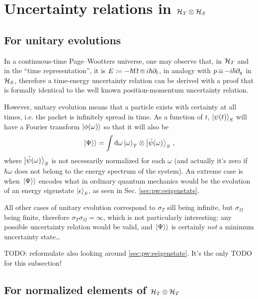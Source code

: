 \section{Uncertainty relations in $\mathcal{H}_T \otimes \mathcal{H}_S$}\label{sec:pw:uncertainty}

\subsection{For unitary evolutions}

In a continuous-time Page--Wootters universe,
one may observe that,
in $\mathcal{H}_T$ and in the ``time representation'',
it is $E \coloneqq -\hbar{\Omega} \operatorname*{\equiv} i\hbar\partial_{t}$,
in analogy with ${p} \operatorname*{\equiv} -i\hbar\partial_{q}$ in $\mathcal{H}_S$,
therefore a time-energy uncertainty relation can be derived
with a proof that is formally identical to the well known
position-momentum uncertainty relation.

However, unitary evolution means that a particle exists with
certainty at all times, i.e. the packet
is infinitely spread in time.
%
As a function of $t$, $\ket{\psi(t)}_S$ will have a Fourier transform
$\ket{\phi(\omega)}$
so that it will also be
\begin{equation}\label{eq:pwfourier}
  \left.\left| \Psi \right\rangle\right\rangle = \int \dd \omega \ket{\omega}_T \otimes \ket{\tilde{\psi}(\omega)}_S \, \text{,}
\end{equation}
where $\ket{\tilde{\psi}(\omega)}_S$ is not necessarily normalized for each $\omega$
(and actually it's zero if $\hbar\omega$ does not belong to the energy spectrum of the system).
An extreme case is when $\left.\left| \Psi \right\rangle\right\rangle$ encodes what in ordinary quantum mechanics would be the evolution
of an energy eigenstate $\ket{\epsilon}_S$, as seen in Sec. \ref{sec:pw:eeigenstate}.

All other cases of unitary evolution correspond to $\sigma_{T}$
sill being infinite, but $\sigma_{\Omega}$ being finite, therefore
$\sigma_{T}\sigma_{\Omega} = \infty$, which is not particularly interesting:
any possible uncertainty relation would be valid, and $\left.\left| \Psi \right\rangle\right\rangle$
is certainly \emph{not} a minimum uncertainty state\dots 

TODO: reformulate also looking around \ref{sec:pw:eeigenstate}. It's the only TODO for this subsection!

\subsection{For normalized elements of $\mathcal{H}_T \otimes \mathcal{H}_T$}\label{sec:for-normalized-elements}

